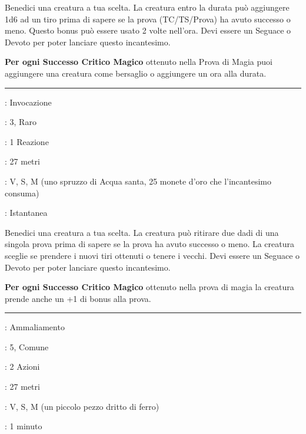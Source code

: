 \begin{multicols}{2}
Benedici una creatura a tua scelta. La creatura entro la durata può aggiungere 1d6 ad un tiro prima di sapere se la prova (TC/TS/Prova) ha avuto successo o meno. Questo bonus può essere usato 2 volte nell'ora. Devi essere un Seguace o Devoto per poter lanciare questo incantesimo.

\textbf{Per ogni Successo Critico Magico} ottenuto nella Prova di Magia puoi aggiungere una creatura come bersaglio o aggiungere un ora alla durata.

\smallskip\noindent\rule{\linewidth}{2pt} \hypertarget{Benedizione Suprema}{}\medskip{}
\noindent
\begin{description}[noitemsep, topsep=0pt, parsep=0pt, partopsep=0pt, leftmargin=0cm, labelwidth=2.8cm]
	\item[\textbf{Lista di Magia}]: Invocazione
	\item[\textbf{Livello}]: 3, Raro
	\item[\textbf{T. di Lancio}]: 1 Reazione
	\item[\textbf{Gittata}]: 27 metri
	\item[\textbf{Componenti}]: V, S, M (uno spruzzo di Acqua santa, 25 monete d'oro che l'incantesimo consuma)
	\item[\textbf{Durata}]: Istantanea
\end{description}

Benedici una creatura a tua scelta. La creatura può ritirare due dadi di una singola prova prima di sapere se la prova ha avuto successo o meno. La creatura sceglie se prendere i nuovi tiri ottenuti o tenere i vecchi. Devi essere un Seguace o Devoto per poter lanciare questo incantesimo.

\textbf{Per ogni Successo Critico Magico} ottenuto nella prova di magia la creatura prende anche un +1 di bonus alla prova.

\smallskip\noindent\rule{\linewidth}{2pt} \hypertarget{Blocca Mostri}{}\medskip{}
\noindent
\begin{description}[noitemsep, topsep=0pt, parsep=0pt, partopsep=0pt, leftmargin=0cm, labelwidth=2.8cm]
	\item[\textbf{Lista di Magia}]: Ammaliamento
	\item[\textbf{Livello}]: 5, Comune
	\item[\textbf{T. di Lancio}]: 2 Azioni
	\item[\textbf{Gittata}]: 27 metri
	\item[\textbf{Componenti}]: V, S, M (un piccolo pezzo dritto di ferro)
	\item[\textbf{Durata}]: 1 minuto
\end{description}


\end{multicols}
